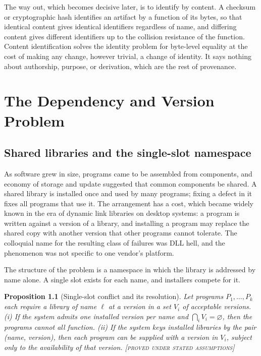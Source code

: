 \documentclass[11pt,twoside,openright]{book}
\theoremstyle{plain}
\newtheorem{proposition}[theorem]{Proposition}
\theoremstyle{definition}
\theoremstyle{remark}
\newcommand{\Proved}{\textup{\textsc{[proved under stated assumptions]}}}
\begin{document}
The way out, which becomes decisive later, is to identify by content. A checksum or cryptographic hash identifies an artifact by a function of its bytes, so that identical content gives identical identifiers regardless of name, and differing content gives different identifiers up to the collision resistance of the function. Content identification solves the identity problem for byte-level equality at the cost of making any change, however trivial, a change of identity. It says nothing about authorship, purpose, or derivation, which are the rest of provenance.

\chapter{The Dependency and Version Problem}\label{ch:depversion}

\section{Shared libraries and the single-slot namespace}

As software grew in size, programs came to be assembled from components, and economy of storage and update suggested that common components be shared. A shared library is installed once and used by many programs; fixing a defect in it fixes all programs that use it. The arrangement has a cost, which became widely known in the era of dynamic link libraries on desktop systems: a program is written against a version of a library, and installing a program may replace the shared copy with another version that other programs cannot tolerate. The colloquial name for the resulting class of failures was DLL hell, and the phenomenon was not specific to one vendor's platform.

The structure of the problem is a namespace in which the library is addressed by name alone. A single slot exists for each name, and installers compete for it.

\begin{proposition}[Single-slot conflict and its resolution]\label{prop:slot}
Let programs $P_1,\dots,P_k$ each require a library of name $\ell$ at a version in a set $V_i$ of acceptable versions. (i) If the system admits one installed version per name and $\bigcap_i V_i=\varnothing$, then the programs cannot all function. (ii) If the system keys installed libraries by the pair (name, version), then each program can be supplied with a version in $V_i$, subject only to the availability of that version.
\Proved{}
\end{proposition}
\end{document}
